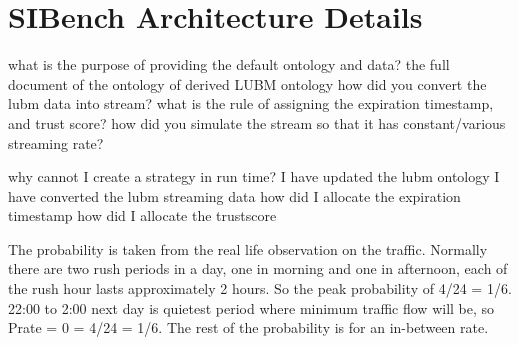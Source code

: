 \chapter{SIBench Architecture Details}
what is the purpose of providing the default ontology and data?
the full document of the ontology of derived LUBM ontology
how did you convert the lubm data into stream? 
what is the rule of assigning the expiration timestamp, and trust score?
how did you simulate the stream so that it has constant/various streaming rate? 

why cannot I create a strategy in run time?
I have updated the lubm ontology
I have converted the lubm streaming data
how did I allocate the expiration timestamp
how did I allocate the trustscore

The probability is taken from the real life observation on the traffic.
Normally there are two rush periods in a day, one in morning and one in afternoon, each of the rush hour lasts approximately 2 hours. 
So the peak probability of 4/24 = 1/6. 
22:00 to 2:00 next day is quietest period where minimum traffic flow will be, so P{rate = 0} = 4/24 = 1/6. 
The rest of the probability is for an in-between rate. 


